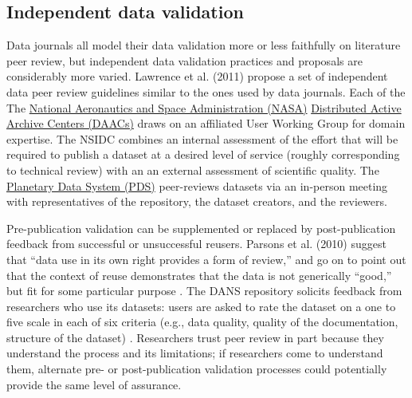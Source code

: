 \documentclass[10pt,a4paper,twocolumn]{article}
\begin{document}
{{\subsection*{Independent data validation}

Data journals all model their data validation more or less faithfully on literature peer review, but independent data validation practices and proposals are considerably more varied.
Lawrence et al. (2011) propose a set of independent data peer review guidelines similar to the ones used by data journals\cite{lawrence_citation_2011}.
Each of the The \href{http://www.nasa.gov/}{National Aeronautics and Space Administration (NASA)} \href{https://earthdata.nasa.gov/}{Distributed Active Archive Centers (DAACs)} draws on an affiliated User Working Group for domain expertise.
The NSIDC combines an internal assessment of the effort that will be required to publish a dataset at a desired level of service (roughly corresponding to technical review) with an an external assessment of scientific quality.
The \href{https://pds.jpl.nasa.gov/}{Planetary Data System (PDS)} peer-reviews datasets via an in-person meeting with representatives of the repository, the dataset creators, and the reviewers.  

Pre-publication validation can be supplemented or replaced by post-publication feedback from successful or unsuccessful reusers.
Parsons et al. (2010) suggest that ``data use in its own right provides a form of review,'' and go on to point out that the context of reuse demonstrates that the data is not generically ``good,'' but fit for some particular purpose \cite{parsons_data_2010}.
The DANS repository solicits feedback from researchers who use its datasets: users are asked to rate the dataset on a one to five scale in each of six criteria (e.g., data quality, quality of the documentation, structure of the dataset) \cite{grootveld_data_2011,grootveld_peer-reviewed_2012}.
Researchers trust peer review in part because they understand the process and its limitations; if researchers come to understand them, alternate pre- or post-publication validation processes could potentially provide the same level of assurance.

}}
\end{document}
